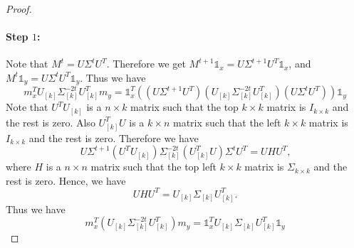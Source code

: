 \documentclass[letterpaper,11pt]{article}
\theoremstyle{plain}
\theoremstyle{definition}
\theoremstyle{remark}
\begin{document}
\begin{proof}
\paragraph{Step $1$:} Note that $M^t=U\Sigma^tU^T$. Therefore we get $M^{t+1}\mathds{1}_x= U\Sigma^{t+1}U^T  \mathds{1}_x$, and $M^t\mathds{1}_y= U\Sigma^tU^T  \mathds{1}_y$. Thus we have
\begin{equation}
\label{eq:pxto1x}
m_x^T U_{[k]} {\Sigma}_{[k]}^{-2t} U_{[k]}^Tm_y = \mathds{1}_x^T \left(\left(U\Sigma^{t+1}U^T \right) \left(U_{[k]} {\Sigma}_{[k]}^{-2t} U_{[k]}^T\right) \left(U\Sigma^tU^T \right) \right)\mathds{1}_y
\end{equation}
Note that $U^T U_{[k]}$ is a $n\times k$ matrix such that the top $k\times k$ matrix is $I_{k\times k}$ and the rest is zero. Also $U_{[k]}^T U$ is a $k\times n$ matrix such that the left $k\times k$ matrix is $I_{k\times k}$ and the rest is zero. Therefore we have 
\[U{\Sigma}^{t+1}\left(U^T U_{[k]}\right) {\Sigma}^{-2t}_{[k]} \left(U^T_{[k]} U\right){\Sigma}^{t}U^T = UHU^T \text{,}\]
where $H$ is a $n\times n$ matrix such that the top left $k\times k$ matrix is $\Sigma_{k\times k}$ and the rest is zero. Hence, we have
\[ U H U^T =U_{[k]} \Sigma_{[k]} U_{[k]}^T\text{.}\]
Thus we have
\begin{equation}
\label{eq:p-vk}
m_{x}^T (U_{[k]} {\Sigma}_{[k]}^{-2t} U_{[k]}^T)m_{y} = \mathds{1}_x^T U_{[k]}\Sigma_{[k]} U_{[k]}^T \mathds{1}_y
\end{equation}


\end{proof}
\end{document}
